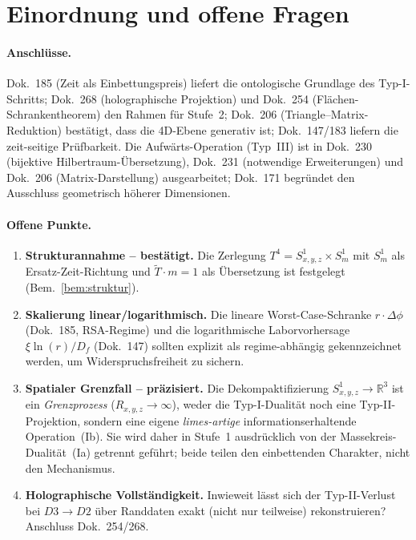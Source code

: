 \section{Einordnung und offene Fragen}\label{sec:offen}

\paragraph{Anschl\"usse.}
Dok.~185 (Zeit als Einbettungspreis) liefert die ontologische Grundlage des
Typ-I-Schritts; Dok.~268 (holographische Projektion) und Dok.~254
(Fl\"achen-Schrankentheorem) den Rahmen f\"ur Stufe~2; Dok.~206
(Triangle--Matrix-Reduktion) best\"atigt, dass die 4D-Ebene generativ ist;
Dok.~147/183 liefern die zeit-seitige Pr\"ufbarkeit. Die Aufw\"arts-Operation
(Typ~III) ist in Dok.~230 (bijektive Hilbertraum-\"Ubersetzung), Dok.~231
(notwendige Erweiterungen) und Dok.~206 (Matrix-Darstellung) ausgearbeitet;
Dok.~171 begr\"undet den Ausschluss geometrisch h\"oherer Dimensionen.

\paragraph{Offene Punkte.}
\begin{enumerate}
  \item \textbf{Strukturannahme -- best\"atigt.} Die Zerlegung
  $T^4 = S^1_{x,y,z}\times S^1_m$ mit $S^1_m$ als Ersatz-Zeit-Richtung und
  $\tilde{T}\cdot m = 1$ als \"Ubersetzung ist festgelegt
  (Bem.~\ref{bem:struktur}).
  \item \textbf{Skalierung linear/logarithmisch.} Die lineare Worst-Case-Schranke
  $r\cdot\Delta\phi$ (Dok.~185, RSA-Regime) und die logarithmische
  Laborvorhersage $\xi\ln(r)/D_f$ (Dok.~147) sollten explizit als
  regime-abh\"angig gekennzeichnet werden, um Widerspruchsfreiheit zu sichern.
  \item \textbf{Spatialer Grenzfall -- pr\"azisiert.} Die Dekompaktifizierung
  $S^1_{x,y,z}\to\mathbb{R}^3$ ist ein \emph{Grenzprozess} ($R_{x,y,z}\to\infty$),
  weder die Typ-I-Dualit\"at noch eine Typ-II-Projektion, sondern eine eigene
  \emph{limes-artige} informationserhaltende Operation~(Ib). Sie wird daher in
  Stufe~1 ausdr\"ucklich von der Massekreis-Dualit\"at~(Ia) getrennt gef\"uhrt;
  beide teilen den einbettenden Charakter, nicht den Mechanismus.
  \item \textbf{Holographische Vollst\"andigkeit.} Inwieweit l\"asst sich der
  Typ-II-Verlust bei $D3\to D2$ \"uber Randdaten exakt (nicht nur teilweise)
  rekonstruieren? Anschluss Dok.~254/268.
\end{enumerate}
